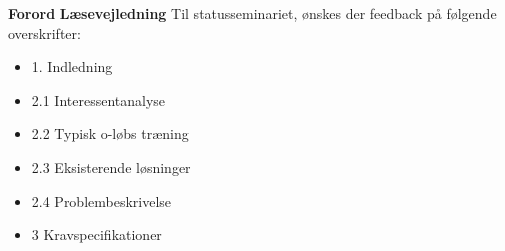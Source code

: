 {\Huge\textbf{Forord}}
 \newline
\newline
\newline
{\Huge\textbf{Læsevejledning}}
Til statusseminariet, ønskes der feedback på følgende overskrifter:
\begin{itemize}
\item 1. Indledning
\item 2.1  Interessentanalyse
\item 2.2 Typisk o-løbs træning
\item 2.3 Eksisterende løsninger
\item 2.4 Problembeskrivelse
\item 3 Kravspecifikationer
\end{itemize}